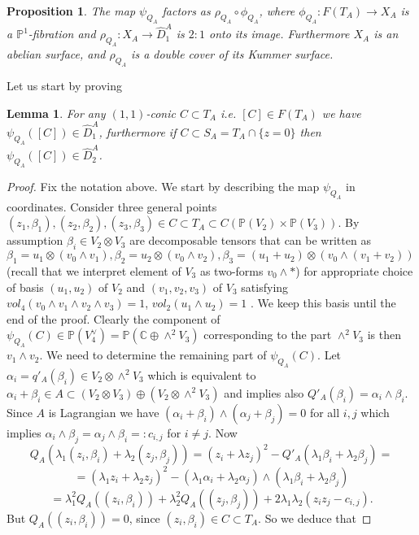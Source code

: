 \documentclass[a4paper,11pt]{amsart}
\newtheorem{lem}[thm]{Lemma}
\newtheorem{prop}[thm]{Proposition}
\theoremstyle{definition}
\numberwithin{equation}{section}
\numberwithin{equation}{section} \theoremstyle{definition}
\begin{document}
\begin{prop}\label{hilb lagr} The map  $\psi_{Q_A}$ factors as $\rho_{Q_A}\circ \phi_{Q_A}$, where $\phi_{Q_A}:F(T_A)\to X_A $ is a ${{\mathbb{P}}}^1$-fibration and
$\rho_{Q_A}:X_A\to \hat{D}_1^A$ is $2:1$ onto its image.  Furthermore $X_A$ is an abelian surface, and $\rho_{Q_A}$ is a double cover of its Kummer surface.
\end{prop}

Let us start by proving 
\begin{lem}  For any $(1,1)$-conic $C\subset T_A$ i.e. $[C]\in F(T_A)$ we have $\psi_{Q_A}([C])\in \hat{D}_1^A$, furthermore if $C\subset S_A=T_A\cap \{z=0\}$ then $\psi_{Q_A}([C])\in \hat{D}_2^A$.
\end{lem}
\begin{proof} Fix the notation above. We start by describing the map $\psi_{Q_A}$ in coordinates. 
 Consider three general points $(z_1,\beta_1), (z_2,\beta_2), (z_3,\beta_3) \in C\subset T_A \subset C({{\mathbb{P}}}(V_2)\times {{\mathbb{P}}}(V_3))$.
 By assumption $\beta_i \in V_2\otimes V_3$ are decomposable tensors that can be written as $\beta_1=u_1\otimes (v_0\wedge v_1),  \beta_2=u_2\otimes (v_0\wedge v_2), \beta_3=(u_1+u_2)\otimes (v_0\wedge (v_1+v_2))$ (recall that we interpret element of $V_3$ as two-forms $v_0\wedge *$) for appropriate choice of basis $(u_1,u_2)$ of $V_2$ and $(v_1,v_2,v_3)$ of $V_3$ satisfying $vol_4(v_0\wedge v_1\wedge v_2\wedge v_3)=1$, $vol_2(u_1\wedge u_2)=1$ . We keep this basis until the end of the proof. Clearly the component of $\psi_{Q_A}(C)\in {{\mathbb{P}}}(V_4^{\vee})={{\mathbb{P}}}({{\mathbb{C}  }}\oplus \wedge^2 V_3)$ corresponding to the part $\wedge^2 V_3$ is then $v_1\wedge v_2$. We need to determine the remaining part of $\psi_{Q_A}(C)$. Let $\alpha_i=q'_A(\beta_i)\in V_2\otimes \wedge^2 V_3$ which is equivalent to  $\alpha_i+\beta_i \in A\subset (V_2\otimes V_3)\oplus (V_2\otimes \wedge^2 V_3)$ and implies also $Q'_A(\beta_i)=\alpha_i\wedge \beta_i$.
 Since $A$ is Lagrangian we have $(\alpha_i+\beta_i)\wedge(\alpha_j+\beta_j)=0$ for all $i,j$ which implies  
 $\alpha_i\wedge\beta_j=\alpha_j\wedge\beta_i=:c_{i,j}$ for $i\neq j$. 
Now 
$$Q_A(\lambda_1 (z_i,\beta_i)+\lambda_2 (z_j,\beta_j))=(z_i+\lambda z_j)^2- Q'_A(\lambda_1\beta_i+ \lambda_2 \beta_j)=$$
$$=(\lambda_1 z_i+\lambda_2 z_j)^2- (\lambda_1\alpha_i+ \lambda_2 \alpha_j)\wedge(\lambda_1\beta_i+ \lambda_2 \beta_j)$$
$$=\lambda_1^2 Q_A((z_i,\beta_i))+\lambda_2^2 Q_A((z_j,\beta_j))+2 \lambda_1\lambda_2 (z_iz_j-c_{i,j}).$$
But $Q_A((z_i,\beta_i))=0$, since $(z_i,\beta_i)\in C\subset T_A$. So we deduce that

\end{proof}
\end{document}
